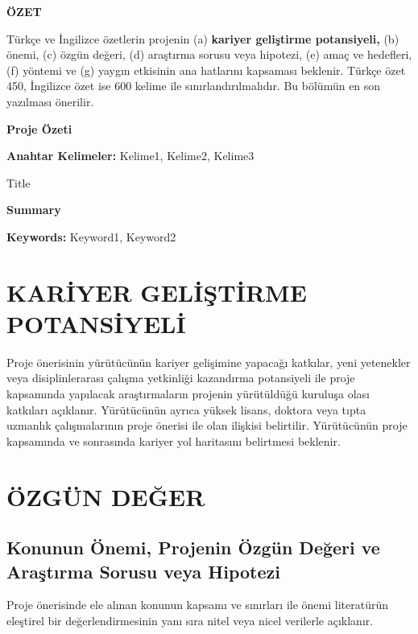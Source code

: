 \documentclass[a4paper]{article}
\begin{document}
\vspace{0.3cm}
\noindent\textbf{ÖZET}
\vspace{0.1cm}

\noindent Türkçe ve İngilizce özetlerin projenin (a) \textbf{kariyer geliştirme potansiyeli,} (b) önemi, (c) özgün değeri, (d) araştırma sorusu
veya hipotezi, (e) amaç ve hedefleri, (f) yöntemi ve (g) yaygın etkisinin ana hatlarını kapsaması beklenir. Türkçe özet 450,
İngilizce özet ise 600 kelime ile sınırlandırılmalıdır. Bu bölümün en son yazılması önerilir. 

\begin{ozet}
\begin{center}
\textbf{Proje Özeti}
\end{center}

\lipsum[1-3]
\tcbline*
\noindent\textbf{Anahtar Kelimeler:} 
Kelime1, Kelime2, Kelime3
\end{ozet}


\begin{summary}{Title}
\begin{center}
\textbf{Summary}
\end{center}

\lipsum[1-5]
\tcbline*
\noindent\textbf{Keywords:} 
Keyword1, Keyword2
\end{summary}

\section{KARİYER GELİŞTİRME POTANSİYELİ}

\noindent Proje önerisinin yürütücünün kariyer gelişimine yapacağı katkılar, yeni yetenekler veya disiplinlerarası çalışma yetkinliği
kazandırma potansiyeli ile proje kapsamında yapılacak araştırmaların projenin yürütüldüğü kuruluşa olası katkıları
açıklanır. Yürütücünün ayrıca yüksek lisans, doktora veya tıpta uzmanlık çalışmalarının proje önerisi ile olan ilişkisi
belirtilir. Yürütücünün proje kapsamında ve sonrasında kariyer yol haritasını belirtmesi beklenir.

\begin{framed}
\lipsum[1-5]
\end{framed}

\section{ÖZGÜN DEĞER}
\subsection{Konunun Önemi, Projenin Özgün Değeri ve Araştırma Sorusu veya Hipotezi}
\noindent Proje önerisinde ele alınan konunun kapsamı ve sınırları ile önemi literatürün eleştirel bir değerlendirmesinin yanı sıra nitel
veya nicel verilerle açıklanır.\\
\end{document}
